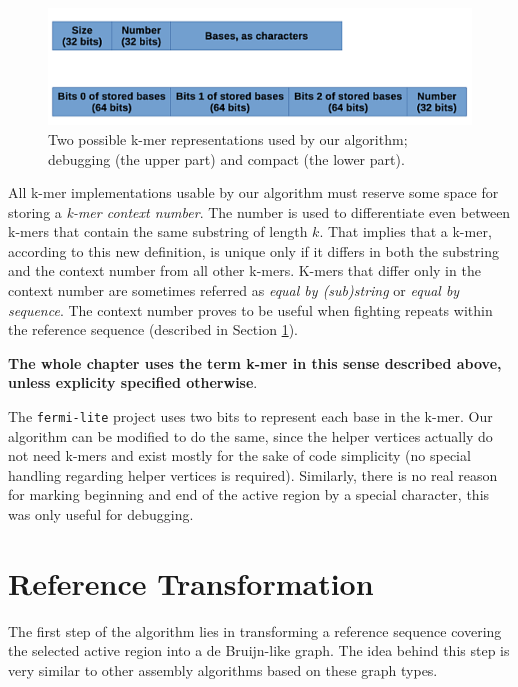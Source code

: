 \begin{figure}[h]
	\centering
	\includegraphics{img/kmer-representations}
	\caption{Two possible k-mer representations used by our algorithm; debugging (the upper part) and compact (the lower part).}
	\label{fig:kmer-representations}
\end{figure}

All k-mer implementations usable by our algorithm must reserve some space for storing a \textit{k-mer context number}. The number is used to differentiate even between k-mers that contain the same substring of length $k$. That implies that a k-mer, according to this new definition, is unique only if it differs in both the substring and the context number from all other k-mers. K-mers that differ only in the context number are sometimes referred as \textit{equal by (sub)string} or \textit{equal by sequence}. The context number proves to be useful when fighting repeats within the reference sequence (described in Section \ref{sec:reference-transformation}).

\textbf{The whole chapter uses the term k-mer in this sense described above, unless explicity specified otherwise}.

The \texttt{fermi-lite} project uses two bits to represent each base in the k-mer. Our algorithm can be modified to do the same, since the helper vertices actually do not need k-mers and exist mostly for the sake of code simplicity (no special handling regarding helper vertices is required). Similarly, there is no real reason for marking beginning and end of the active region by a special character, this was only useful for debugging.

\section{Reference Transformation}
\label{sec:reference-transformation}

The first step of the algorithm lies in transforming a reference sequence covering the selected active region into a de Bruijn-like graph. The idea behind this step is very similar to other assembly algorithms based on these graph types. 

